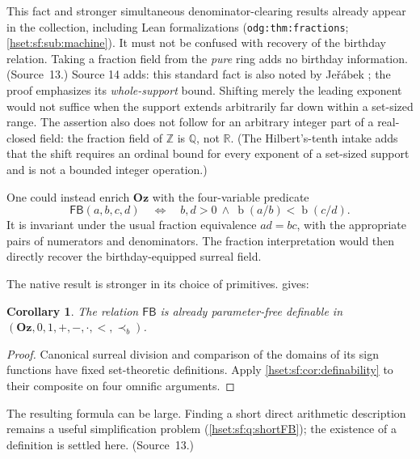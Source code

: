 \documentclass[11pt,letterpaper]{article}
\newtheorem{corollary}[corollary]{Corollary}\aliascntresetthe{corollary}
\theoremstyle{definition}
\theoremstyle{remark}
\newcommand{\bd}{\operatorname{b}}
\newcommand{\lbl}[1]{\nolinkurl{#1}}
\newcommand{\Oz}{\mathbf{Oz}}
\newcommand{\R}{\mathbb R}
\newcommand{\Q}{\mathbb Q}
\newcommand{\Z}{\mathbb Z}
\newcommand{\precb}{\prec_b}
\newcommand{\FB}{\mathsf{FB}}
\begin{document}
This fact and stronger simultaneous denominator-clearing results already appear in
the collection, including Lean formalizations (\lbl{odg:thm:fractions};
\cref{hset:sf:sub:machine}). It must not be confused with recovery of the birthday
relation. Taking a fraction field from the \emph{pure} ring adds no birthday
information. (Source~13.) Source 14 adds: this standard fact is also noted by
Je\v{r}\'abek \cite{JerabekOz}; the proof emphasizes its \emph{whole-support} bound.
Shifting merely the leading exponent would not suffice when the support extends
arbitrarily far down within a set-sized range. The assertion also does not follow
for an arbitrary integer part of a real-closed field: the fraction field of $\Z$
is $\Q$, not $\R$. (The Hilbert's-tenth intake adds that the shift requires an
ordinal bound for every exponent of a set-sized support and is not a bounded
integer operation.)

One could instead enrich $\Oz$ with the four-variable predicate
\[
 \FB(a,b,c,d)\quad\Longleftrightarrow\quad b,d>0\ \land\ \bd(a/b)<\bd(c/d).
\]
It is invariant under the usual fraction equivalence $ad=bc$, with the appropriate
pairs of numerators and denominators. The fraction interpretation would then
directly recover the birthday-equipped surreal field.

The native result is stronger in its choice of primitives.
 gives:

\begin{corollary}\label{hset:sf:cor:fractionbirthday}
The relation $\FB$ is already parameter-free definable in
$(\Oz,0,1,+,-,\cdot,<,\precb)$.
\end{corollary}
\begin{proof}
Canonical surreal division and comparison of the domains of its sign functions
have fixed set-theoretic definitions. Apply \cref{hset:sf:cor:definability} to
their composite on four omnific arguments.
\end{proof}

The resulting formula can be large. Finding a short direct arithmetic description
remains a useful simplification problem (\cref{hset:sf:q:shortFB}); the existence
of a definition is settled here. (Source~13.)
\end{document}
